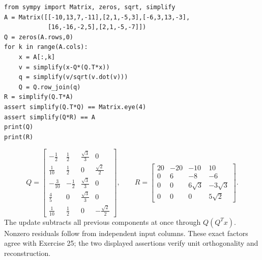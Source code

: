 \begin{verbatim}
from sympy import Matrix, zeros, sqrt, simplify
A = Matrix([[-10,13,7,-11],[2,1,-5,3],[-6,3,13,-3],
            [16,-16,-2,5],[2,1,-5,-7]])
Q = zeros(A.rows,0)
for k in range(A.cols):
    x = A[:,k]
    v = simplify(x-Q*(Q.T*x))
    q = simplify(v/sqrt(v.dot(v)))
    Q = Q.row_join(q)
R = simplify(Q.T*A)
assert simplify(Q.T*Q) == Matrix.eye(4)
assert simplify(Q*R) == A
print(Q)
print(R)
\end{verbatim}
\[Q=\left[\begin{array}{rrrr}- \frac{1}{2}&\frac{1}{2}&\frac{\sqrt{3}}{3}&0\\\frac{1}{10}&\frac{1}{2}&0&\frac{\sqrt{2}}{2}\\- \frac{3}{10}&- \frac{1}{2}&\frac{\sqrt{3}}{3}&0\\\frac{4}{5}&0&\frac{\sqrt{3}}{3}&0\\\frac{1}{10}&\frac{1}{2}&0&- \frac{\sqrt{2}}{2}\end{array}\right],\qquad R=\left[\begin{array}{rrrr}20&-20&-10&10\\0&6&-8&-6\\0&0&6 \sqrt{3}&- 3 \sqrt{3}\\0&0&0&5 \sqrt{2}\end{array}\right].\]
The update subtracts all previous components at once through $Q(Q^Tx)$. Nonzero residuals follow from independent input columns. These exact factors agree with Exercise 25; the two displayed assertions verify unit orthogonality and reconstruction.
